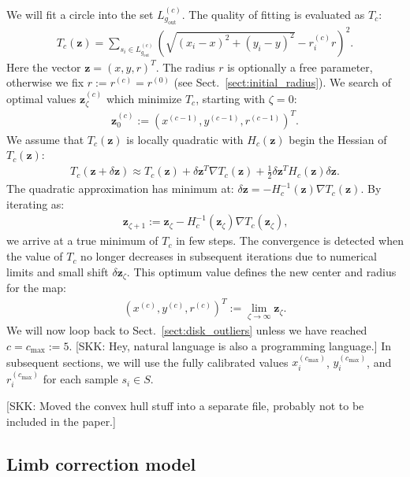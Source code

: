 \documentclass{aa}
\newcommand{\skk}[1]{\textcolor{midorange}{[SKK: #1]}} %
\newcommand{\eqnl}[2]{\begin{eqnarray}\label{#1}#2\end{eqnarray}}
\newcommand{\s}[2]{{#1}_{\mathrm{#2}}}
\begin{document}
  We will fit a circle into the set $L^{(c)}_{\s{g}{out}}$. The quality of fitting is evaluated as $T_c$:
  \eqnl{subsequent_centering1}{
  T_c(\bm{z}) = \sum \limits_{s_i \in L^{(c)}_{\s{g}{out}}} \left( \sqrt{\left( x_i - x \right)^2 + \left( y_i - y \right)^2} - r_i^{(c)} r \right)^2 \text{.}
  }
  Here the vector $\bm{z} = \left( x, y, r \right)^T$.
  The radius $r$ is optionally a free parameter, otherwise we fix $r := r^{(c)} = r^{(0)}$ (see 
  Sect.~\ref{sect:initial_radius}). We search of optimal values $\bm{z}_{\zeta}^{(c)}$ which minimize $T_c$, starting with $\zeta=0$:
  \eqnl{subsequent_centering2}{
  \bm{z}_0^{(c)} := \left( x^{(c-1)}, y^{(c-1)}, r^{(c-1)} \right)^T \text{.}
  }
  We assume that $T_c(\bm{z})$ is locally quadratic with $H_c(\bm{z})$ begin the Hessian of $T_c(\bm{z})$:
  \eqnl{subsequent_centering3}{
  T_c(\bm{z}+\delta \bm{z}) \approx T_c(\bm{z}) + \delta \bm{z}^T \nabla T_c(\bm{z}) + \frac{1}{2} \delta \bm{z}^T H_c(\bm{z}) \delta \bm{z} \text{.}
  }
  The quadratic approximation has minimum at: $\delta \bm{z} = -H_c^{-1}(\bm{z}) \nabla T_c(\bm{z})$. By iterating as:
  \eqnl{subsequent_centering4}{
  \bm{z}_{\zeta+1} := \bm{z}_{\zeta} - H_c^{-1}(\bm{z}_{\zeta}) \nabla T_c(\bm{z}_{\zeta}) \text{,}
  }
  we arrive at a true minimum of $T_c$ in few steps. The convergence is detected when the value of $T_c$ no longer 
  decreases in subsequent iterations due to numerical limits and small shift $\delta \bm{z}_{\zeta}$. This optimum value defines the new center and radius for the map:
  \eqnl{subsequent_centering5}{
  \left( x^{(c)}, y^{(c)}, r^{(c)} \right)^T := \lim \limits_{\zeta \to \infty} \bm{z}_{\zeta} \text{.}
  }
  We will now loop back to Sect.~\ref{sect:disk_outliers} unless we have reached $c = \s{c}{max} := 5$. \skk{Hey, natural language is also a programming language.}
  In subsequent sections, we will use the fully calibrated values $x_i^{(\s{c}{max})}$, $y_i^{(\s{c}{max})}$, and $r_i^{(\s{c}{max})}$ for each sample $s_i \in S$.

\skk{Moved the convex hull stuff into a separate file, probably not to be included in the paper.}

\subsection{Limb correction model}\label{sect:limb}
\end{document}
